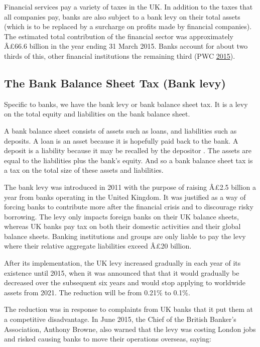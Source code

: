 \documentclass[]{tufte-handout}
\begin{document}
Financial services pay a variety of taxes in the UK. In addition to the
taxes that all companies pay, banks are also subject to a bank levy on
their total assets (which is to be replaced by a surcharge on profits
made by financial companies). The estimated total contribution of the
financial sector was approximately Â£66.6 billion in the year ending 31
March 2015. Banks account for about two thirds of this, other financial
institutions the remaining third (PWC
\protect\hyperlink{ref-PWC2015}{2015}).

\hypertarget{the-bank-balance-sheet-tax-bank-levy}{%
\subsection{The Bank Balance Sheet Tax (Bank
levy)}\label{the-bank-balance-sheet-tax-bank-levy}}

Specific to banks, we have the bank levy or bank balance sheet tax. It
is a levy on the total equity and liabilities on the bank balance sheet.

A bank balance sheet consists of assets such as loans, and liabilities
such as deposits. A loan is an asset because it is hopefully paid back
to the bank. A deposit is a liability because it may be recalled by the
depositor . The assets are equal to the liabilities plus the bank's
equity. And so a bank balance sheet tax is a tax on the total size of
these assets and liabilities.

The bank levy was introduced in 2011 with the purpose of raising Â£2.5
billion a year from banks operating in the United Kingdom. It was
justified as a way of forcing banks to contribute more after the
financial crisis and to discourage risky borrowing. The levy only
impacts foreign banks on their UK balance sheets, whereas UK banks pay
tax on both their domestic activities and their global balance sheets.
Banking institutions and groups are only liable to pay the levy where
their relative aggregate liabilities exceed Â£20 billion.

After its implementation, the UK levy increased gradually in each year
of its existence until 2015, when it was announced that that it would
gradually be decreased over the subsequent six years and would stop
applying to worldwide assets from 2021. The reduction will be from
0.21\% to 0.1\%.

The reduction was in response to complaints from UK banks that it put
them at a competitive disadvantage. In June 2015, the Chief of the
British Banker's Association, Anthony Browne, also warned that the levy
was costing London jobs and risked causing banks to move their
operations overseas, saying:
\end{document}
